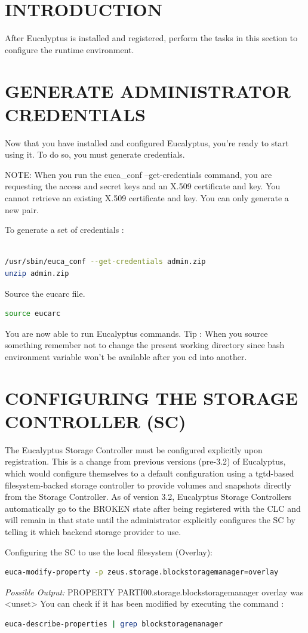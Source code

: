 \section{INTRODUCTION}
After Eucalyptus is installed and registered, perform the tasks in this section to configure the runtime environment.
\section{GENERATE ADMINISTRATOR CREDENTIALS}

Now that you have installed and configured Eucalyptus, you're ready to start using it. To do so, you must generate credentials.

NOTE: When you run the euca\_conf --get-credentials command, you are requesting the access and secret keys and an X.509 certificate and key. You cannot retrieve an existing X.509 certificate and key. You can only generate a new pair.

To generate a set of credentials :
\begin{lstlisting}[language=bash]

/usr/sbin/euca_conf --get-credentials admin.zip
unzip admin.zip
\end{lstlisting}
Source the eucarc file.
\begin{lstlisting}[language=bash]
source eucarc
\end{lstlisting}
You are now able to run Eucalyptus commands.
Tip :  When you source something remember not to change the present working directory since bash environment variable won't be available after you cd into another.

\section{CONFIGURING THE STORAGE CONTROLLER (SC)}
The Eucalyptus Storage Controller must be configured explicitly upon registration. This is a change from previous versions (pre-3.2) of Eucalyptus, which would configure themselves to a default configuration using a tgtd-based filesystem-backed storage controller to provide volumes and snapshots directly from the Storage Controller. As of version 3.2, Eucalyptus Storage Controllers automatically go to the BROKEN state after being registered with the CLC and will remain in that state until the administrator explicitly configures the SC by telling it which backend storage provider to use.


Configuring the SC to use the local filesystem (Overlay):
\begin{lstlisting}[language=bash]
euca-modify-property -p zeus.storage.blockstoragemanager=overlay
\end{lstlisting}
\textit{Possible Output:}
PROPERTY	PARTI00.storage.blockstoragemanager	overlay was <unset>
You can check if it has been modified by executing the command :
\begin{lstlisting}[language=bash]
	euca-describe-properties | grep blockstoragemanager
	\end{lstlisting}
